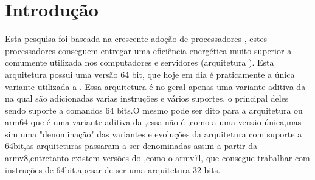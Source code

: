 \documentclass[
	12pt,				%
	openright,			%
	oneside,			%
	a4paper,			%
	english,			%
	french,				%
	spanish,			%
	brazil,				%
	]{abntex2}
\begin{document}
\tableofcontents*

\textual
\setcounter{page}{1}
\chapter*{Introdução}
\label{ch:introducao}
Esta pesquisa foi baseada na crescente adoção de processadores , estes processadores conseguem entregar uma eficiência energética muito superior a comumente utilizada nos computadores e servidores (arquitetura ). Esta arquitetura possui uma versão 64 bit, que hoje em dia é praticamente a única variante utilizada a . Essa arquitetura é no geral apenas uma variante aditiva da  na qual são adicionadas varias instruções e vários suportes, o principal deles sendo suporte a comandos 64 bits.O mesmo pode ser dito para a arquitetura  ou arm64 que é uma variante aditiva da ,essa não é ,como a  uma versão única,mas sim uma "denominação" das variantes e evoluções da arquitetura  com suporte a 64bit,as arquiteturas passaram a ser denominadas assim a partir da armv8,entretanto existem versões do ,como o armv7l, que consegue trabalhar com instruções de 64bit,apesar de ser uma arquitetura 32 bits.\newline
\end{document}
